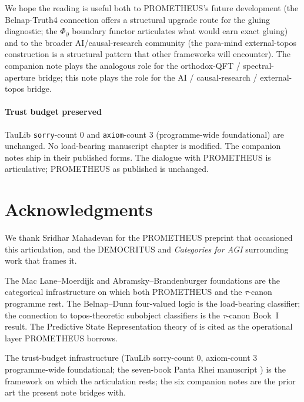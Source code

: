 \documentclass{pantarhei-researchnote}
\newcommand{\PsiD}{\ensuremath{\Phi_{\partial}}}
\begin{document}
We hope the reading is useful both to PROMETHEUS's future
development (the Belnap-Truth4 connection offers a structural
upgrade route for the gluing diagnostic; the $\PsiD$ boundary
functor articulates what would earn exact gluing) and to the
broader AI/causal-research community (the para-mind external-topos
construction is a structural pattern that other frameworks will
encounter). The companion note \cite{FuchsFuchs-running-aperture-v1}
plays the analogous role for the orthodox-QFT / spectral-aperture
bridge; this note plays the role for the AI / causal-research /
external-topos bridge.

\paragraph{Trust budget preserved}
TauLib \cite{TauLib2026} \texttt{sorry}-count $0$ and \texttt{axiom}-count
$3$ (programme-wide foundational) are unchanged. No load-bearing
manuscript chapter is modified. The companion notes
\cite{FuchsFuchs-bsmm-interpretation-v1,FuchsFuchs-bsmm-anomaly-v19,FuchsFuchs-T1-v1,FuchsFuchs-F2-projection-v1,FuchsFuchs-running-aperture-v1,FuchsFuchs-foundations-billiards-v1}
ship in their published forms. The dialogue with PROMETHEUS is
articulative; PROMETHEUS as published is unchanged.

\section*{Acknowledgments}

We thank Sridhar Mahadevan for the PROMETHEUS preprint
\cite{Mahadevan-PROMETHEUS-2026} that occasioned this articulation,
and the DEMOCRITUS \cite{Mahadevan-Democritus-2025a} and
\emph{Categories for AGI} \cite{Mahadevan-CatAGI-2025c}
surrounding work that frames it.

The Mac Lane--Moerdijk \cite{MacLane-Moerdijk-1992} and
Abramsky--Brandenburger \cite{Abramsky-Brandenburger-2011}
foundations are the categorical infrastructure on which both
PROMETHEUS and the $\tau$-canon programme rest. The
Belnap--Dunn \cite{Belnap-1977,Dunn-1976} four-valued logic is the
load-bearing classifier; the connection to topos-theoretic
subobject classifiers is the $\tau$-canon Book~I result. The
Predictive State Representation theory of
\cite{Littman-Sutton-Singh-2001} is cited as the operational layer
PROMETHEUS borrows.

The trust-budget infrastructure (TauLib \cite{TauLib2026}
sorry-count $0$, axiom-count $3$ programme-wide foundational; the
seven-book Panta Rhei manuscript \cite{PantaRhei-BookI,PantaRhei-BookIII,PantaRhei-BookVII})
is the framework on which the articulation rests; the six
companion notes
\cite{FuchsFuchs-bsmm-interpretation-v1,FuchsFuchs-bsmm-anomaly-v19,FuchsFuchs-T1-v1,FuchsFuchs-F2-projection-v1,FuchsFuchs-running-aperture-v1,FuchsFuchs-foundations-billiards-v1}
are the prior art the present note bridges with.



\end{document}
